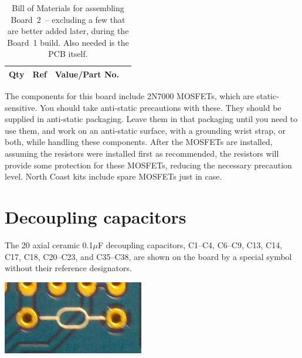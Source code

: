 \begin{table}
{\centering
{}
\vspace{\baselineskip}

\begin{tabular}{rp{1.4in}cp{2.9in}}
  \textbf{Qty} & \textbf{Ref} & \textbf{Value/Part No.} & \\ \hline

\end{tabular}\par}
\caption{Bill of Materials for assembling Board~2~-- excluding a few that
are better added later, during the Board~1 build.  Also needed is the PCB
itself.}\label{tab:b2bom}
\end{table}

The components for this board include 2N7000 MOSFETs, which are
static-sensitive.  You should take anti-static precautions with these.  They
should be supplied in anti-static packaging.  Leave them in that packaging
until you need to use them, and work on an anti-static surface, with a
grounding wrist strap, or both, while handling these components.  After the
MOSFETs are installed, assuming the resistors were installed first as
recommended, the resistors will provide some protection for these MOSFETs,
reducing the necessary precaution level.  North Coast kits
include spare MOSFETs just in case.

\section{Decoupling capacitors}

The 20 axial ceramic 0.1$\mu$F decoupling capacitors, C1--C4, C6--C9, C13,
C14, C17, C18, C20--C23, and C35--C38, are shown on the board by a special
symbol without their reference designators.

\nopagebreak
\noindent\includegraphics[width=\linewidth]{decoup-symbol.jpg}

